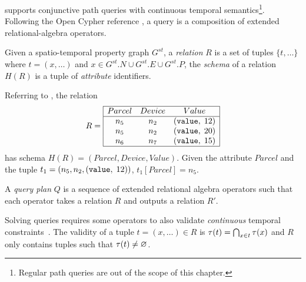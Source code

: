 
\ourapproach supports conjunctive path queries with continuous temporal semantics\footnote{Regular path queries are out of the scope of this chapter.}.
Following the Open Cypher reference \cite{francis2018cypher}, a query is a composition of extended relational-algebra operators.

\begin{definition}[Relation]
Given a spatio-temporal property graph $G^{st}$, a \emph{relation} $R$ is a set of tuples $\{t,\dots\}$ where $t=(x,\dots)$ and $x \in G^{st}.N \cup G^{st}.E \cup G^{st}.P$, the \emph{schema} of a relation $H(R)$ is a tuple of \emph{attribute} identifiers.
\end{definition}

\begin{example}
Referring to , the relation 
{\small\[R =
\begin{array}{|ccc|}
\hline
Parcel & Device & Value\\
\hline
n_5 & n_2 & (\texttt{value},\;12)\\
n_5 & n_2 & (\texttt{value},\;20)\\
n_6 & n_7 & (\texttt{value},\;15)\\
\hline
\end{array}
\]}
has schema $H(R)=(Parcel, Device, Value)$. 
Given the attribute $Parcel$ and the tuple $t_1=(n_5, n_2, (\texttt{value},\;12))$, $t_1[Parcel]=n_5$.
\end{example}

\begin{definition}
A \emph{query plan} $Q$ is a sequence of extended relational algebra operators such that each operator takes a relation $R$ and outputs a relation $R'$.%
\end{definition}

Solving queries requires some operators to also validate \textit{continuous} temporal constraints~\cite{rizzolo2008temporal}.
The validity of a tuple $t=(x,\dots)\in R$ is $\tau(t)= \bigcap_{x \in t} \tau(x)$ and $R$ only contains tuples such that $\tau(t) \ne \varnothing$.

